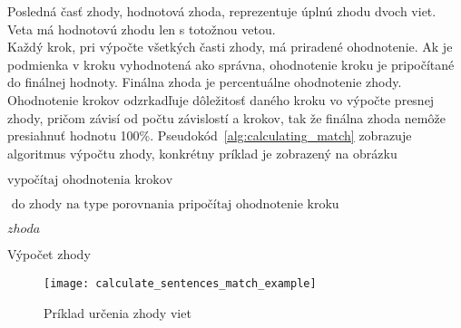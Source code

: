 Posledná časť zhody, hodnotová zhoda, reprezentuje úplnú zhodu dvoch viet. Veta má hodnotovú zhodu len s totožnou vetou. \\

Každý krok, pri výpočte všetkých časti zhody, má priradené ohodnotenie. Ak je podmienka v kroku vyhodnotená ako správna, ohodnotenie kroku je pripočítané do finálnej hodnoty. Finálna zhoda je percentuálne ohodnotenie zhody. Ohodnotenie krokov odzrkadľuje dôležitosť daného kroku vo výpočte presnej zhody, pričom závisí od počtu závislostí a krokov, tak že finálna zhoda nemôže presiahnuť hodnotu 100\%. Pseudokód~\ref{alg:calculating_match} zobrazuje algoritmus výpočtu zhody, konkrétny príklad je zobrazený na obrázku~

\begin{algorithm}[H]
	\footnotesize %
	\begin{algorithmic}[1]

		\State $\text{vypočítaj ohodnotenia krokov}$
		
%		
		\State $\text{ do zhody na type porovnania pripočítaj ohodnotenie kroku}$
		\EndIf
		\EndFor
		\EndFor
		\EndFor
		
		\Return $zhoda$
		\EndProcedure
	\end{algorithmic}
	\caption[Výpočet zhody]{Výpočet zhody}	
	\label{alg:calculating_match}
\end{algorithm}

\begin{figure}[H]
	\begin{center}\texttt{[image: calculate\_sentences\_match\_example]}\end{center}
	\caption[Príklad určenia zhody viet]{Príklad určenia zhody viet}\label{fig:calculate_match_sentences_example}
\end{figure}

